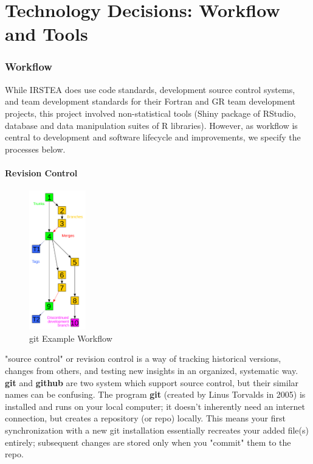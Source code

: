 \documentclass[logos,parttoc,morelanguage=french,morelanguage=german]{orsay-memoire}
\begin{document}
\part{Technology Decisions: Workflow and Tools}

\section{Workflow}

While IRSTEA does use code standards, development source control systems, and team development standards for their Fortran and GR team development projects, this project involved non-statistical tools (Shiny package of RStudio, database and data manipulation suites of R libraries). However, as workflow is central to development and software lifecycle and improvements, we specify the processes below.

\subsection{Revision Control}

\begin{figure}
\centering
\includegraphics[width=0.22\textwidth]{images/440px-Revision_controlled_project_visualization-2010-24-02_svg.png}
  \caption{git Example Workflow}
  \label{fig:gitbranches}
\end{figure}

"\gls{source control}" or revision control is a way of tracking historical versions, changes from others, and testing new insights in an organized, systematic way. \textbf{git} and \textbf{github} are two system which support source control, but their similar names can be confusing. The program \textbf{git} (created by Linus Torvalds in 2005) is installed and runs on your local computer; it doesn't inherently need an internet connection, but creates a repository (or repo) locally. This means your first synchronization with a new git installation essentially recreates your added file(s) entirely; subsequent changes are stored only when you "commit" them to the repo.
\end{document}
